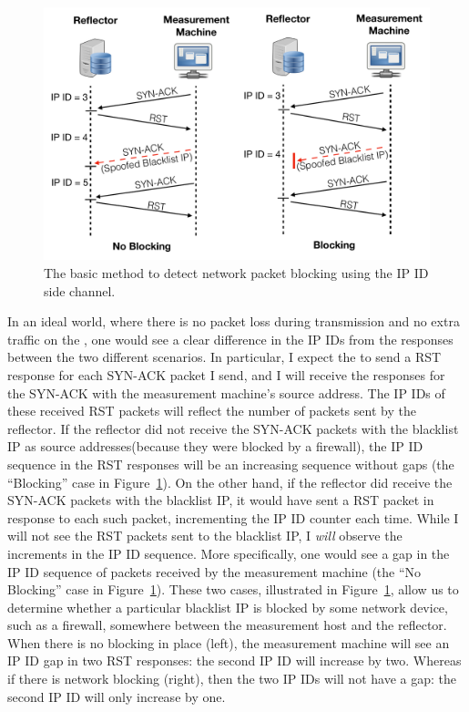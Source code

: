 
\begin{figure}[t]
    \centering
    \includegraphics[width=0.98\columnwidth]{data_usage/images/cropped_method_protocol_v2.pdf}
    \caption{The basic method to detect network packet blocking using the IP ID side channel.}
    \label{fig:coreidea}
\end{figure}

In an ideal world, where there is no packet loss during transmission
and no extra traffic on the {}, one would see a clear difference
in the IP IDs from the responses between the two different scenarios.
In particular, I expect the {} to send a RST response for
each SYN-ACK packet I send, and I will receive the responses for
the SYN-ACK with the measurement machine's source address. The IP IDs of 
these received RST packets will reflect the number of packets sent by the
reflector. If the reflector did not receive the SYN-ACK packets with the
blacklist IP as source addresses(because they were blocked by a
firewall), the IP ID sequence in the RST responses will be an
increasing sequence without gaps (the ``Blocking'' case in Figure~\ref{fig:coreidea}).
On the other hand, if the reflector did
receive the SYN-ACK packets with the blacklist IP, it would have sent
a RST packet in response to each such packet, incrementing the IP ID counter
each time. While I will not see the RST packets sent to the blacklist
IP, I \emph{will} observe the increments in the IP ID sequence.
More specifically, one would see a gap in the IP ID sequence of packets
received by the measurement machine (the ``No Blocking'' case in
Figure~\ref{fig:coreidea}).
These two cases, illustrated in Figure~\ref{fig:coreidea}, allow us to
determine whether a particular blacklist IP is blocked by some network
device, such as a firewall, somewhere between the measurement host and
the reflector. When there is no blocking in place (left), the measurement
machine will see an IP ID gap in two RST responses: the second IP ID will
increase by two. Whereas if there is network blocking (right), then the
two IP IDs will not have a gap: the second IP ID will only increase by
one.

